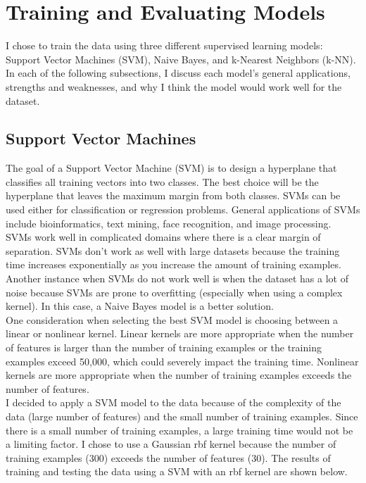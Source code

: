 \documentclass[11pt]{article}
\begin{document}
\section{Training and Evaluating Models}

I chose to train the data using three different supervised learning models: Support Vector Machines (SVM), Naive Bayes, and k-Nearest Neighbors (k-NN). In each of the following subsections, I discuss each model's general applications, strengths and weaknesses, and why I think the model would work well for the dataset.

\subsection{Support Vector Machines}

The goal of a Support Vector Machine (SVM) is to design a hyperplane that classifies all training vectors into two classes. The best choice will be the hyperplane that leaves the maximum margin from both classes. SVMs can be used either for classification or regression problems. General applications of SVMs include bioinformatics, text mining, face recognition, and image processing.\\

SVMs work well in complicated domains where there is a clear margin of separation. SVMs don’t work as well with large datasets because the training time increases exponentially as you increase the amount of training examples. Another instance when SVMs do not work well is when the dataset has a lot of noise because SVMs are prone to overfitting (especially when using a complex kernel). In this case, a Naive Bayes model is a better solution.\\

One consideration when selecting the best SVM model is choosing between a linear or nonlinear kernel. Linear kernels are more appropriate when the number of features is larger than the number of training examples or the training examples exceed 50,000, which could severely impact the training time. Nonlinear kernels are more appropriate when the number of training examples exceeds the number of features.\\

I decided to apply a SVM model to the data because of the complexity of the data (large number of features) and the small number of training examples. Since there is a small number of training examples, a large training time would not be a limiting factor. I chose to use a Gaussian rbf kernel because the number of training examples (300) exceeds the number of features (30). The results of training and testing the data using a SVM with an rbf kernel are shown below.\\
\end{document}
